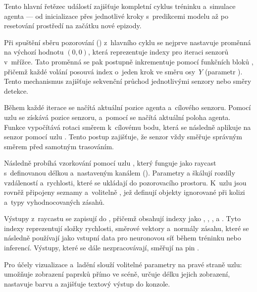 Tento hlavní řetězec událostí zajišťuje kompletní cyklus tréninku a~simulace agenta — od inicializace přes jednotlivé kroky s~predikcemi modelu až po resetování prostředí na začátku nové epizody.

Při spuštění sběru pozorování () z~hlavního cyklu se nejprve nastavuje proměnná  na výchozí hodnotu $(0,0)$, která reprezentuje indexy pro iteraci senzorů v~mřížce. Tato proměnná se pak postupně inkrementuje pomocí funkčních bloků , přičemž každé volání posouvá index o~jeden krok ve směru osy~$Y$ (parametr ). Tento mechanismus zajišťuje sekvenční průchod jednotlivými senzory nebo směry detekce.

\newpage

Během každé iterace se načítá aktuální pozice agenta a~cílového senzoru. Pomocí uzlu  se získává pozice senzoru, a~pomocí  se načítá aktuální poloha agenta. Funkce  vypočítává rotaci směrem k~cílovému bodu, která se následně aplikuje na senzor pomocí uzlu . Tento postup zajišťuje, že senzor vždy směřuje správným směrem před samotným trasováním.

Následně probíhá vzorkování pomocí uzlu , který funguje jako raycast s~definovanou délkou a~nastaveným kanálem (). Parametry  a  škálují rozdíly vzdáleností a~rychlosti, které se ukládají do pozorovacího prostoru. K~uzlu jsou rovněž připojeny seznamy  a~volitelně , jež definují objekty ignorované při kolizi a~typy vyhodnocovaných zásahů.

Výstupy z~raycastu se zapisují do , přičemž obsahují indexy jako , , ,  a . Tyto indexy reprezentují složky rychlosti, směrové vektory a~normály zásahu, které se následně používají jako vstupní data pro neuronovou síť během tréninku nebo inferencí. Výstupy, které se dále nezpracovávají, směřují na pin .

Pro účely vizualizace a~ladění slouží volitelné parametry na pravé straně uzlu:  umožňuje zobrazení paprsků přímo ve scéně,  určuje délku jejich zobrazení,  nastavuje barvu a  zajišťuje textový výstup do konzole.

